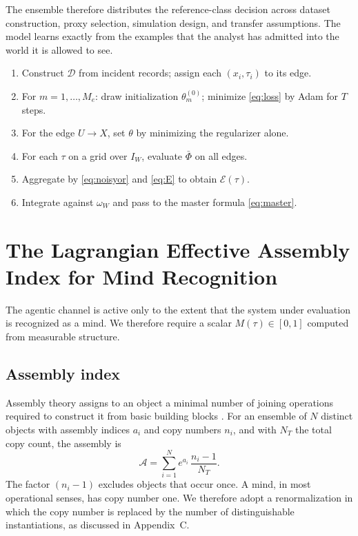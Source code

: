 \documentclass[11pt]{article}
\theoremstyle{remark}
\begin{document}
The ensemble therefore distributes the reference-class decision across dataset construction, proxy selection, simulation design, and transfer assumptions. The model learns exactly from the examples that the analyst has admitted into the world it is allowed to see.

\begin{tcolorbox}[title={\textbf{Procedure 1.} Training and evaluation of the edge ensemble},colback=white,colframe=black,fonttitle=\small]
\small
\begin{enumerate}[leftmargin=1.5em,itemsep=1pt]
\item Construct $\mathcal{D}$ from incident records; assign each $(x_i,\tau_i)$ to its edge.
\item For $m=1,\dots,M_e$: draw initialization $\theta_m^{(0)}$; minimize \eqref{eq:loss} by Adam for $T$ steps.
\item For the edge $U\to X$, set $\theta$ by minimizing the regularizer alone.
\item For each $\tau$ on a grid over $I_W$, evaluate $\bar\Phi$ on all edges.
\item Aggregate by \eqref{eq:noisyor} and \eqref{eq:E} to obtain $\mathcal{E}(\tau)$.
\item Integrate against $\omega_W$ and pass to the master formula \eqref{eq:master}.
\end{enumerate}
\end{tcolorbox}

\section{The Lagrangian Effective Assembly Index for Mind Recognition}\label{sec:lagr}

The agentic channel is active only to the extent that the system under evaluation is recognized as a mind. We therefore require a scalar $M(\tau)\in[0,1]$ computed from measurable structure.

\subsection{Assembly index}

Assembly theory assigns to an object a minimal number of joining operations required to construct it from basic building blocks \cite{sharma2023}. For an ensemble of $N$ distinct objects with assembly indices $a_i$ and copy numbers $n_i$, and with $N_T$ the total copy count, the assembly is
\begin{equation}\label{eq:assembly}
\mathcal{A}=\sum_{i=1}^{N} e^{a_i}\,\frac{n_i-1}{N_T}.
\end{equation}
The factor $(n_i-1)$ excludes objects that occur once. A mind, in most operational senses, has copy number one. We therefore adopt a renormalization in which the copy number is replaced by the number of distinguishable instantiations, as discussed in Appendix~C.
\end{document}
